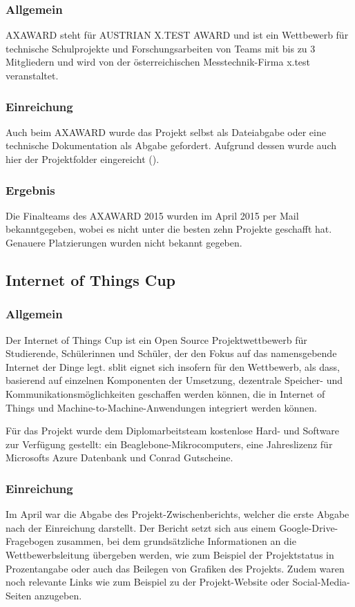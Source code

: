 \subsubsection{Allgemein}
AXAWARD steht für AUSTRIAN X.TEST AWARD und ist ein Wettbewerb für technische Schulprojekte und Forschungsarbeiten
von Teams mit bis zu 3 Mitgliedern und wird von der österreichischen Messtechnik-Firma x.test veranstaltet.

\subsubsection{Einreichung}
Auch beim AXAWARD wurde das Projekt selbst als Dateiabgabe oder eine technische
Dokumentation als Abgabe gefordert. Aufgrund dessen wurde auch hier der Projektfolder eingereicht ().

\subsubsection{Ergebnis}
Die Finalteams des AXAWARD 2015 wurden im April 2015 per Mail bekanntgegeben, wobei es \sblit nicht
unter die besten zehn Projekte geschafft hat. Genauere Platzierungen wurden nicht bekannt gegeben.


\subsection{Internet of Things Cup}
\subsubsection{Allgemein}
Der Internet of Things Cup ist ein Open Source Projektwettbewerb für Studierende, Schülerinnen und Schüler,
der den Fokus auf das namensgebende Internet der Dinge legt. sblit eignet sich insofern für den Wettbewerb,
als dass, basierend auf einzelnen Komponenten der Umsetzung, dezentrale Speicher- und Kommunikationsmöglichkeiten
geschaffen werden können, die in Internet of Things und Machine-to-Machine-Anwendungen integriert werden können.

Für das Projekt wurde dem Diplomarbeitsteam kostenlose Hard- und Software zur Verfügung gestellt: ein
Beaglebone-Mikrocomputers, eine Jahreslizenz für Microsofts Azure Datenbank und Conrad Gutscheine.

\subsubsection{Einreichung}
Im April war die Abgabe des Projekt-Zwischenberichts, welcher die erste Abgabe nach
der Einreichung darstellt. Der Bericht setzt sich aus einem Google-Drive-Fragebogen
zusammen, bei dem grundsätzliche Informationen an die Wettbewerbsleitung übergeben
werden, wie zum Beispiel der Projektstatus in Prozentangabe oder auch das Beilegen
von Grafiken des Projekts. Zudem waren noch relevante Links wie zum Beispiel zu der
Projekt-Website oder Social-Media-Seiten anzugeben.

